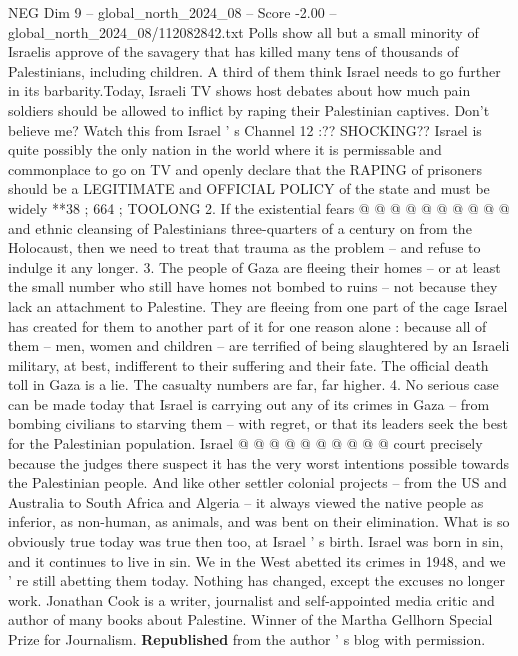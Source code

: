 \begin{textsample}{NEG Dim 9 – global\_north\_2024\_08 – Score -2.00 – global\_north\_2024\_08/112082842.txt}
Polls show all but a small minority of Israelis approve of the savagery that has killed many tens of thousands of Palestinians, including children.
A third of them think Israel needs to go further in its barbarity.Today, Israeli TV shows host debates about how much pain soldiers should be allowed to inflict by raping their Palestinian captives.
Don't believe me?
Watch this from Israel ' s Channel 12 :??
SHOCKING??
Israel is quite possibly the only nation in the world where it is permissable and commonplace to go on TV and openly declare that the RAPING of prisoners should be a LEGITIMATE and OFFICIAL POLICY of the state and must be widely **38 ; 664 ; TOOLONG 2.
If the existential fears @ @ @ @ @ @ @ @ @ @ and ethnic cleansing of Palestinians three-quarters of a century on from the Holocaust, then we need to treat that trauma as the problem -- and refuse to indulge it any longer. 3.
The people of Gaza are fleeing their homes -- or at least the small number who still have homes not bombed to ruins -- not because they lack an attachment to Palestine.
They are fleeing from one part of the cage Israel has created for them to another part of it for one reason alone : because all of them -- men, women and children -- are terrified of being slaughtered by an Israeli military, at best, indifferent to their suffering and their fate.
The official death toll in Gaza is a lie.
The casualty numbers are far, far higher. 4.
No serious case can be made today that Israel is carrying out any of its crimes in Gaza -- from bombing civilians to starving them -- with regret, or that its leaders seek the best for the Palestinian population.
Israel @ @ @ @ @ @ @ @ @ @ court precisely because the judges there suspect it has the very worst intentions possible towards the Palestinian people.
And like other settler colonial projects -- from the US and Australia to South Africa and Algeria -- it always viewed the native people as inferior, as non-human, as animals, and was bent on their elimination.
What is so obviously true today was true then too, at Israel ' s birth.
Israel was born in sin, and it continues to live in sin.
We in the West abetted its crimes in 1948, and we ' re still abetting them today.
Nothing has changed, except the excuses no longer work.
Jonathan Cook is a writer, journalist and self-appointed media critic and author of many books about Palestine.
Winner of the Martha Gellhorn Special Prize for Journalism. \textbf{Republished} from the author ' s blog with permission.

\end{textsample}
